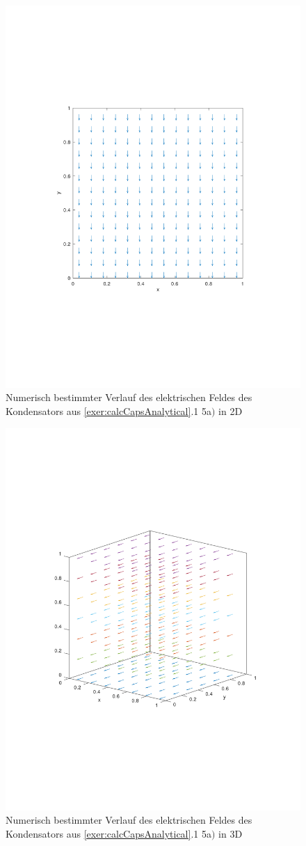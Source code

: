 \documentclass[Protokollheft.tex]{subfiles}
\begin{document}
\begin{figure}[h!]
	\centering
	\includegraphics[trim = 20mm 70mm 20mm 70mm, clip,width=0.7\linewidth]{E_2D_A.pdf}
	\caption{Numerisch bestimmter Verlauf des elektrischen Feldes des Kondensators aus \ref{exer:calcCapsAnalytical}.1 5a$)$ in 2D}
	\label{fig:potA}
\end{figure}

\begin{figure}[h!]
	\centering
	\includegraphics[trim = 20mm 70mm 20mm 70mm, clip,width=0.7\linewidth]{E_3D_A.pdf}
	\caption{Numerisch bestimmter Verlauf des elektrischen Feldes des Kondensators aus \ref{exer:calcCapsAnalytical}.1 5a$)$ in 3D}
	\label{fig:potA}
\end{figure}
\end{document}
